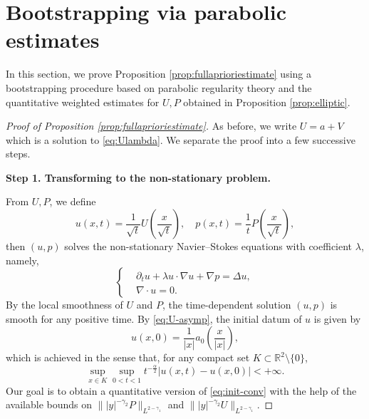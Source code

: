 \documentclass[12pt,reqno]{amsart}
\theoremstyle{plain}
\theoremstyle{definition}
\newcommand{\R}{\mathbb{R}}
\renewcommand{\:}{\colon}
\numberwithin{equation}{section}
\numberwithin{figure}{section}
\begin{document}
\section{Bootstrapping via parabolic estimates} \label{sec:bootstrap}


In this section, we prove Proposition \ref{prop:fullaprioriestimate} using a bootstrapping procedure based on parabolic regularity theory and  the quantitative weighted estimates for $U, P$ obtained in Proposition \ref{prop:elliptic}.

\begin{proof}[Proof of Proposition \ref{prop:fullaprioriestimate}]
As before, we write $U = a + V$ which is a solution to \eqref{eq:Ulambda}. We separate the proof into a few successive steps.

    \smallskip
    \textbf{Step 1. Transforming to the non-stationary problem.}
    \smallskip

    
From $U, P$, we define
\begin{equation} \label{eq:up-def}
    u(x,t) = \frac{1}{\sqrt{t}} U\left(\frac{x}{\sqrt{t}}\right), \quad p(x,t) = \frac{1}{t} P\left(\frac{x}{\sqrt{t}}\right),
\end{equation}
then $(u,p)$ solves the non-stationary Navier--Stokes equations with coefficient $\lambda$, namely, 
\begin{equation} \label{eq:u-NS}
    \left\{\begin{aligned}
        &\partial_t u +  \lambda u \cdot \nabla u + \nabla p = \Delta u, \\
        &\nabla \cdot u = 0.
    \end{aligned}
    \right.
\end{equation}
By the local smoothness of $U$ and $P$, the time-dependent solution $(u, p)$ is  smooth for any positive time. By \eqref{eq:U-asymp}, the initial datum of $u$ is given by
\begin{equation} \label{eq:init-datum}
    u(x,0) = \frac{1}{|x|} a_0\left(\frac{x}{|x|}\right),
\end{equation}
which is achieved in the sense that, for any compact set $K \subset \R^2\setminus \{0\}$,
\begin{equation} \label{eq:init-conv}
    \sup_{x \in K} \sup_{0<t<1} t^{-\frac{\alpha}{2}}|u(x,t)-u(x,0)| < + \infty.
\end{equation}
Our goal is to obtain a quantitative version of \eqref{eq:init-conv} with the help of the available bounds on $\||y|^{-{\gamma_2}} P\|_{L^{2-{\gamma_1}}}$ and $\||y|^{-{\gamma_2}} U\|_{L^{2-{\gamma_1}}}$.



\end{proof}
\end{document}
